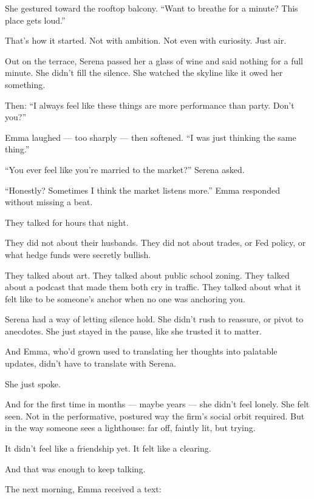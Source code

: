 She gestured toward the rooftop balcony. ``Want to breathe for a minute? This place gets loud.''

That’s how it started. Not with ambition. Not even with curiosity. Just air.

Out on the terrace, Serena passed her a glass of wine and said nothing for a full minute. She didn’t 
fill the silence. She watched the skyline like it owed her something.

Then:  
``I always feel like these things are more performance than party. Don’t you?''

Emma laughed --- too sharply --- then softened. ``I was just thinking the same thing.''

``You ever feel like you’re married to the market?'' Serena asked.

``Honestly? Sometimes I think the market listens more.'' Emma responded without missing a beat.

They talked for hours that night.

They did not about their husbands.
They did not about trades, or Fed policy, or what hedge funds were secretly bullish.

They talked about art. They talked about public school zoning. They talked about a podcast that 
made them both cry in traffic. They talked about what it felt like to be someone’s anchor when 
no one was anchoring you.

Serena had a way of letting silence hold. She didn’t rush to reassure, or pivot to anecdotes. 
She just stayed in the pause, like she trusted it to matter.

And Emma, who’d grown used to translating her thoughts into palatable updates, didn’t have 
to translate with Serena.

She just spoke.

And for the first time in months --- maybe years --- she didn’t feel lonely.
She felt seen. Not in the performative, postured way the firm’s social orbit required.
But in the way someone sees a lighthouse: far off, faintly lit, but trying.

It didn’t feel like a friendship yet.
It felt like a clearing.

And that was enough to keep talking.

The next morning, Emma received a text:

